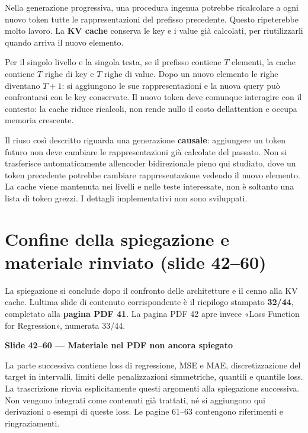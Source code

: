 \documentclass[11pt,a4paper,oneside,openany]{book}
\renewenvironment{quote}{\list{}{\leftmargin=1em\rightmargin=0pt}\item\relax}{\endlist}
\begin{document}
Nella generazione progressiva, una procedura ingenua potrebbe ricalcolare a ogni nuovo token tutte le rappresentazioni del prefisso precedente. Questo ripeterebbe molto lavoro. La \textbf{KV cache} conserva le key e i value già calcolati, per riutilizzarli quando arriva il nuovo elemento.

Per il singolo livello e la singola testa, se il prefisso contiene \(T\) elementi, la cache contiene \(T\) righe di key e \(T\) righe di value. Dopo un nuovo elemento le righe diventano \(T+1\): si aggiungono le sue rappresentazioni e la nuova query può confrontarsi con le key conservate. Il nuovo token deve comunque interagire con il contesto: la cache riduce ricalcoli, non rende nullo il costo dell\textquotesingle attention e occupa memoria crescente.

Il riuso così descritto riguarda una generazione \textbf{causale}: aggiungere un token futuro non deve cambiare le rappresentazioni già calcolate del passato. Non si trasferisce automaticamente all\textquotesingle encoder bidirezionale pieno qui studiato, dove un token precedente potrebbe cambiare rappresentazione vedendo il nuovo elemento. La cache viene mantenuta nei livelli e nelle teste interessate, non è soltanto una lista di token grezzi. I dettagli implementativi non sono sviluppati.

\section{Confine della spiegazione e materiale rinviato (slide 42--60)}\label{f04-r898}

La spiegazione si conclude dopo il confronto delle architetture e il cenno alla KV cache. L\textquotesingle ultima slide di contenuto corrispondente è il riepilogo stampato \textbf{32/44}, completato alla \textbf{pagina PDF 41}. La pagina PDF 42 apre invece «Loss Function for Regression», numerata 33/44.

\begin{quote}
\textbf{Slide 42--60 --- Materiale nel PDF non ancora spiegato}
\end{quote}

\begin{quote}
La parte successiva contiene loss di regressione, MSE e MAE, discretizzazione del target in intervalli, limiti delle penalizzazioni simmetriche, quantili e quantile loss. La trascrizione rinvia esplicitamente questi argomenti alla spiegazione successiva. Non vengono integrati come contenuti già trattati, né si aggiungono qui derivazioni o esempi di queste loss. Le pagine 61--63 contengono riferimenti e ringraziamenti.
\end{quote}
\end{document}
